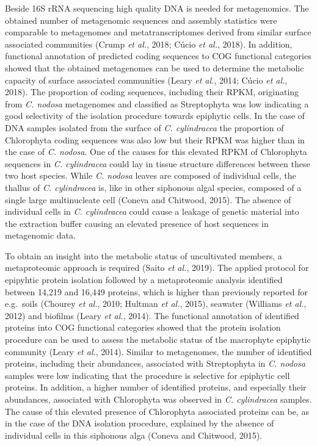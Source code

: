 \documentclass[
  12pt,
]{article}
\begin{document}
Beside 16S rRNA sequencing high quality DNA is needed for metagenomics.
The obtained number of metagenomic sequences and assembly statistics
were comparable to metagenomes and metatranscriptomes derived from
similar surface associated communities (Crump \emph{et al.}, 2018; Cúcio
\emph{et al.}, 2018). In addition, functional annotation of predicted
coding sequences to COG functional categories showed that the obtained
metagenomes can be used to determine the metabolic capacity of surface
associated communities (Leary \emph{et al.}, 2014; Cúcio \emph{et al.},
2018). The proportion of coding sequences, including their RPKM,
originating from \emph{C. nodosa} metagenomes and classified as
Streptophyta was low indicating a good selectivity of the isolation
procedure towards epiphytic cells. In the case of DNA samples isolated
from the surface of \emph{C. cylindracea} the proportion of Chlorophyta
coding sequences was also low but their RPKM was higher than in the case
of \emph{C. nodosa}. One of the causes for this elevated RPKM of
Chlorophyta sequences in \emph{C. cylindracea} could lay in tissue
structure differences between these two host species. While \emph{C.
nodosa} leaves are composed of individual cells, the thallus of \emph{C.
cylindracea} is, like in other siphonous algal species, composed of a
single large multinucleate cell (Coneva and Chitwood, 2015). The absence
of individual cells in \emph{C. cylindracea} could cause a leakage of
genetic material into the extraction buffer causing an elevated presence
of host sequences in metagenomic data.

To obtain an insight into the metabolic status of uncultivated members,
a metaproteomic approach is required (Saito \emph{et al.}, 2019). The
applied protocol for epipyhtic protein isolation followed by a
metaproteomic analysis identified between 14,219 and 16,449 proteins,
which is higher than previously reported for e.g.~soils (Chourey
\emph{et al.}, 2010; Hultman \emph{et al.}, 2015), seawater (Williams
\emph{et al.}, 2012) and biofilms (Leary \emph{et al.}, 2014). The
functional annotation of identified proteins into COG functional
categories showed that the protein isolation procedure can be used to
assess the metabolic status of the macrophyte epiphytic community (Leary
\emph{et al.}, 2014). Similar to metagenomes, the number of identified
proteins, including their abundances, associated with Streptophyta in
\emph{C. nodosa} samples were low indicating that the procedure is
selective for epiphytic cell proteins. In addition, a higher number of
identified proteins, and especially their abundances, associated with
Chlorophyta was observed in \emph{C. cylindracea} samples. The cause of
this elevated presence of Chlorophyta associated proteins can be, as in
the case of the DNA isolation procedure, explained by the absence of
individual cells in this siphonous alga (Coneva and Chitwood, 2015).
\end{document}
